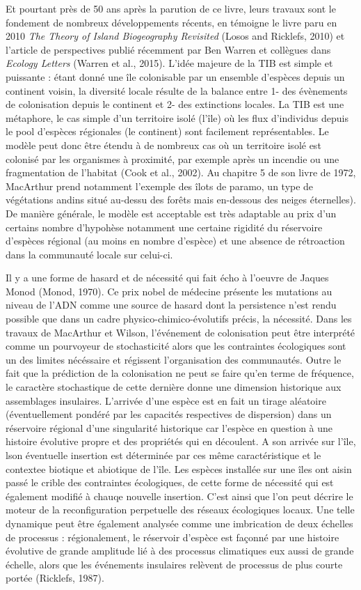 Et pourtant près de 50 ans après la parution de ce livre, leurs travaux
sont le fondement de nombreux développements récents, en témoigne le
livre paru en 2010 \emph{The Theory of Island Biogeography Revisited}
(Losos and Ricklefs, 2010) et l'article de perspectives publié récemment
par Ben Warren et collègues dans \emph{Ecology Letters} (Warren et al.,
2015). L'idée majeure de la TIB est simple et puissante : étant donné
une île colonisable par un ensemble d'espèces depuis un continent
voisin, la diversité locale résulte de la balance entre 1- des
évènements de colonisation depuis le continent et 2- des extinctions
locales. La TIB est une métaphore, le cas simple d'un territoire isolé
(l'île) où les flux d'individus depuis le pool d'espèces régionales (le
continent) sont facilement représentables. Le modèle peut donc être
étendu à de nombreux cas où un territoire isolé est colonisé par les
organismes à proximité, par exemple après un incendie ou une
fragmentation de l'habitat (Cook et al., 2002). Au chapitre 5 de son
livre de 1972, MacArthur prend notamment l'exemple des îlots de paramo,
un type de végétations andins situé au-dessu des forêts mais en-dessous
des neiges éternelles). De manière générale, le modèle est acceptable
est très adaptable au prix d'un certains nombre d'hypohèse notamment une
certaine rigidité du réservoire d'espèces régional (au moins en nombre
d'espèce) et une absence de rétroaction dans la communauté locale sur
celui-ci.

Il y a une forme de hasard et de nécessité qui fait écho à l'oeuvre de
Jaques Monod (Monod, 1970). Ce prix nobel de médecine présente les
mutations au niveau de l'ADN comme une source de hasard dont la
persistence n'est rendu possible que dans un cadre
physico-chimico-évolutifs précis, la nécessité. Dans les travaux de
MacArthur et Wilson, l'événement de colonisation peut être interprété
comme un pourvoyeur de stochasticité alors que les contraintes
écologiques sont un des limites nécéssaire et régissent l'organisation
des communautés. Outre le fait que la prédiction de la colonisation ne
peut se faire qu'en terme de fréquence, le caractère stochastique de
cette dernière donne une dimension historique aux assemblages
insulaires. L'arrivée d'une espèce est en fait un tirage aléatoire
(éventuellement pondéré par les capacités respectives de dispersion)
dans un réservoire régional d'une singularité historique car l'espèce en
question à une histoire évolutive propre et des propriétés qui en
découlent. A son arrivée sur l'île, lson éventuelle insertion est
déterminée par ces même caractéristique et le contextee biotique et
abiotique de l'île. Les espèces installée sur une îles ont aisin passé
le crible des contraintes écologiques, de cette forme de nécessité qui
est également modifié à chauqe nouvelle insertion. C'est ainsi que l'on
peut décrire le moteur de la reconfiguration perpetuelle des réseaux
écologiques locaux. Une telle dynamique peut être également analysée
comme une imbrication de deux échelles de processus : régionalement, le
réservoir d'espèce est façonné par une histoire évolutive de grande
amplitude lié à des processus climatiques eux aussi de grande échelle,
alors que les événements insulaires relèvent de processus de plus courte
portée (Ricklefs, 1987).

